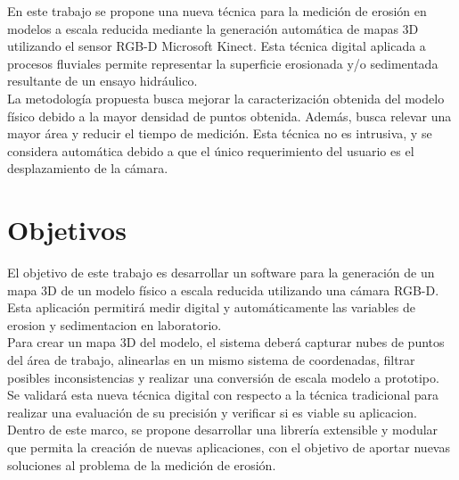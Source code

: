 
En este trabajo se propone una nueva técnica para la medición de erosión en modelos a escala reducida mediante la generación automática de mapas 3D utilizando el sensor
RGB-D Microsoft Kinect. Esta técnica digital aplicada a procesos fluviales permite representar la superficie erosionada y/o sedimentada resultante de un ensayo hidráulico. \\
La metodología propuesta busca mejorar la caracterización obtenida del modelo físico debido a la mayor densidad de puntos obtenida. Además, busca relevar una mayor área y reducir el tiempo de medición. Esta técnica no es intrusiva, y se considera automática debido a que el único requerimiento del usuario es el desplazamiento de la cámara.

\section{Objetivos}
\label{S:objetivos}

El objetivo de este trabajo es desarrollar un software para la generación de un mapa 3D de un modelo físico a escala reducida utilizando una cámara RGB-D. Esta aplicación permitirá medir digital y automáticamente las variables de erosion y sedimentacion en laboratorio. \\
Para crear un mapa 3D del modelo, el sistema deberá capturar nubes de puntos del área de trabajo, alinearlas en un mismo sistema de coordenadas, filtrar posibles inconsistencias y realizar una conversión de escala modelo a prototipo. \\
Se validará esta nueva técnica digital con respecto a la técnica tradicional para realizar una evaluación de su precisión y verificar si es viable su aplicacion. \\
Dentro de este marco, se propone desarrollar una librería extensible y modular que permita la creación de nuevas aplicaciones, con el objetivo de aportar nuevas soluciones al problema de la medición de erosión. \\

